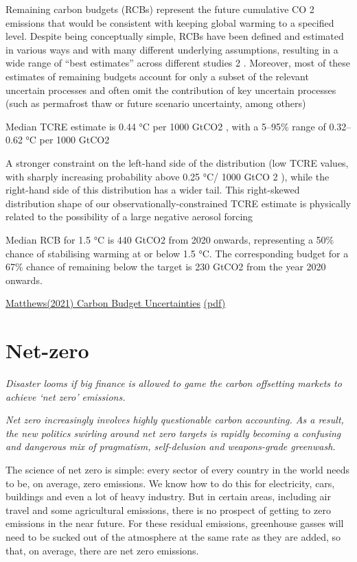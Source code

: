 \documentclass[
]{book}
\begin{document}
Remaining carbon budgets (RCBs) represent the future
cumulative CO 2 emissions that would be consistent with
keeping global warming to a specified level.
Despite being conceptually simple, RCBs have been
defined and estimated in various ways and with many different
underlying assumptions, resulting in a wide range of
``best estimates'' across different studies 2 . Moreover, most of these
estimates of remaining budgets account for only a subset of the
relevant uncertain processes and often omit the contribution of
key uncertain processes (such as permafrost thaw or future
scenario uncertainty, among others)

Median TCRE estimate is 0.44 °C per 1000 GtCO2 , with a 5--95\%
range of 0.32--0.62 °C per 1000 GtCO2

A stronger constraint on the left-hand side of the distribution (low
TCRE values, with sharply increasing probability above 0.25 °C/
1000 GtCO 2 ), while the right-hand side of this distribution has a
wider tail. This right-skewed distribution shape of our
observationally-constrained TCRE estimate is physically related
to the possibility of a large negative aerosol forcing

Median RCB for 1.5 °C is 440 GtCO2 from 2020
onwards, representing a 50\% chance of stabilising warming at or
below 1.5 °C.
The corresponding budget for a 67\% chance of remaining below the target is
230 GtCO2 from the year 2020 onwards.

\href{https://www.nature.com/articles/s43247-020-00064-9}{Matthews(2021) Carbon Budget Uncertainties}
\href{pdf/Matthews_2021_Carbon_Budget_Uncertainties.pdf}{(pdf)}

\hypertarget{net-zero}{%
\section{Net-zero}\label{net-zero}}

\emph{Disaster looms if big finance is allowed to game the carbon offsetting markets to achieve `net zero' emissions.}

\emph{Net zero increasingly involves highly questionable carbon accounting. As a result, the new politics swirling around net zero targets is rapidly becoming a confusing and dangerous mix of pragmatism, self-delusion and weapons-grade greenwash.}

The science of net zero is simple: every sector of every country in the world needs to be, on average, zero emissions. We know how to do this for electricity, cars, buildings and even a lot of heavy industry. But in certain areas, including air travel and some agricultural emissions, there is no prospect of getting to zero emissions in the near future. For these residual emissions, greenhouse gasses will need to be sucked out of the atmosphere at the same rate as they are added, so that, on average, there are net zero emissions.
\end{document}
